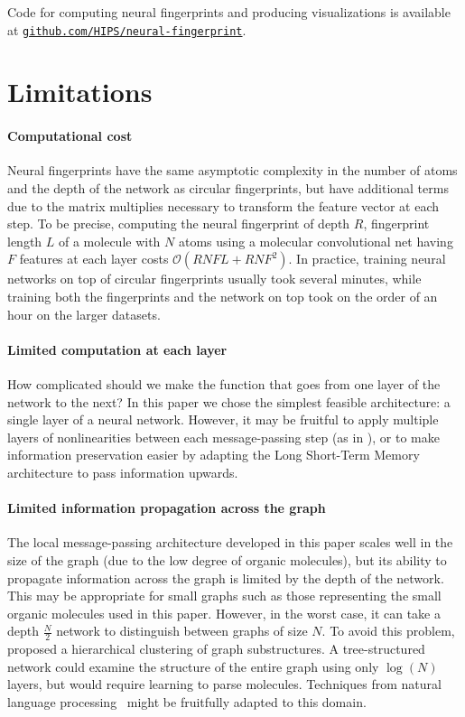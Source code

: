 \documentclass{article}
\newcommand{\citep}{\cite}
\newcommand{\citet}{\cite}
\begin{document}
Code for computing neural fingerprints and producing visualizations is available at \href{http://github.com/HIPS/neural-fingerprint}{\texttt{github.com/HIPS/neural-fingerprint}}.

\section{Limitations}

\paragraph{Computational cost}
Neural fingerprints have the same asymptotic complexity in the number of atoms and the depth of the network as circular fingerprints, but have additional terms due to the matrix multiplies necessary to transform the feature vector at each step.
To be precise, computing the neural fingerprint of depth $R$, fingerprint length $L$ of a molecule with $N$ atoms using a molecular convolutional net having $F$ features at each layer costs $\mathcal{O}(RNFL + RNF^2)$.
In practice, training neural networks on top of circular fingerprints usually took several minutes, while training both the fingerprints and the network on top took on the order of an hour on the larger datasets.

\paragraph{Limited computation at each layer}
How complicated should we make the function that goes from one layer of the network to the next?
In this paper we chose the simplest feasible architecture: a single layer of a neural network.
However, it may be fruitful to apply multiple layers of nonlinearities between each message-passing step (as in \cite{graphnn2009}), or to make information preservation easier by adapting the Long Short-Term Memory~\citep{hochreiter1997long} architecture to pass information upwards.

\paragraph{Limited information propagation across the graph}
The local message-passing architecture developed in this paper scales well in the size of the graph (due to the low degree of organic molecules), but its ability to propagate information across the graph is limited by the depth of the network.
This may be appropriate for small graphs such as those representing the small organic molecules used in this paper.
However, in the worst case, it can take a depth $\frac{N}{2}$ network to distinguish between graphs of size $N$.
To avoid this problem, \citet{bruna2013spectral} proposed a hierarchical clustering of graph substructures.
A tree-structured network could examine the structure of the entire graph using only $\log(N)$ layers, but would require learning to parse molecules.
Techniques from natural language processing~\citep{tai2015improved} might be fruitfully adapted to this domain.
\end{document}
